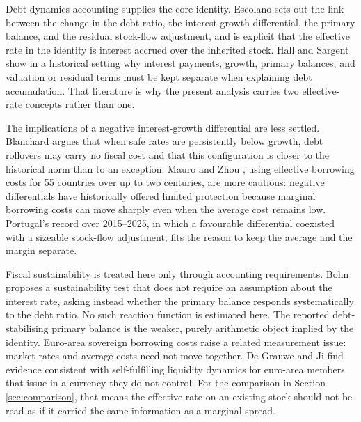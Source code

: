 \documentclass[11pt,a4paper]{article}
\begin{document}
Debt-dynamics accounting supplies the core identity. Escolano
\cite{escolano2010} sets out the link between the change in the debt ratio, the
interest-growth differential, the primary balance, and the residual stock-flow
adjustment, and is explicit that the effective rate in the identity is interest
accrued over the inherited stock. Hall and Sargent \cite{hall_sargent2011} show
in a historical setting why interest payments, growth, primary balances, and
valuation or residual terms must be kept separate when explaining debt
accumulation. That literature is why the present analysis carries two
effective-rate concepts rather than one.

The implications of a negative interest-growth differential are less settled.
Blanchard \cite{blanchard2019} argues that when safe rates are persistently
below growth, debt rollovers may carry no fiscal cost and that this
configuration is closer to the historical norm than to an exception. Mauro and
Zhou \cite{mauro2021}, using effective borrowing costs for 55 countries over up
to two centuries, are more cautious: negative differentials have historically
offered limited protection because marginal borrowing costs can move sharply
even when the average cost remains low. Portugal's record over 2015--2025, in
which a favourable differential coexisted with a sizeable stock-flow
adjustment, fits the reason to keep the average and the margin separate.

Fiscal sustainability is treated here only through accounting requirements.
Bohn \cite{bohn1998} proposes a sustainability test that does not require an
assumption about the interest rate, asking instead whether the primary balance
responds systematically to the debt ratio. No such reaction function is
estimated here. The reported debt-stabilising primary balance is the weaker,
purely arithmetic object implied by the identity. Euro-area sovereign borrowing costs
raise a related measurement issue: market rates and average costs need
not move together. De Grauwe and Ji \cite{degrauwe2013} find evidence
consistent with self-fulfilling liquidity dynamics for euro-area members that
issue in a currency they do not control. For the comparison in Section
\ref{sec:comparison}, that means the effective rate on an existing stock should
not be read as if it carried the same information as a marginal spread.
\end{document}
